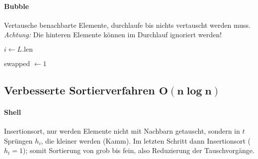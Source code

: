 \paragraph{Bubble}
Vertausche benachbarte Elemente, durchlaufe bis nichts vertauscht werden muss. \emph{Achtung:} Die hinteren Elemente können im Durchlauf ignoriert werden!

\begin{algorithm}[H]


  $i \leftarrow L.\text{len}$

  swapped $\leftarrow 1$

\end{algorithm}

\subsection{Verbesserte Sortierverfahren $\mathbf{O(n \log n)}$}

\paragraph{Shell}
Insertionsort, nur werden Elemente nicht mit Nachbarn getauscht, sondern in $t$ Sprüngen $h_i$, die kleiner werden (Kamm). Im letzten Schritt dann Insertionsort ($h_t = 1$); somit Sortierung von grob bis fein, also Reduzierung der Tauschvorgänge.

\begin{algorithm}[H]


\end{algorithm}

